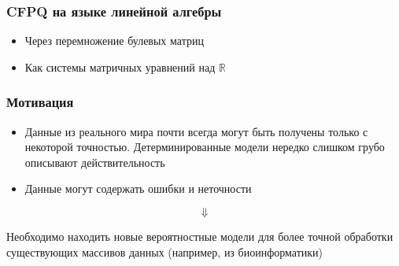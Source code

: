 \documentclass[xcolor=table]{beamer}
\begin{document}
\begin{frame}[fragile]
  \transwipe[direction=90]
  \frametitle{CFPQ на языке линейной алгебры}
\begin{itemize}
  \item Через перемножение булевых матриц
            \begin{minipage}{.9\linewidth}
            \begin{algorithm}[H]
            \begin{algorithmic}
                \EndFor
                \EndWhile
            \end{algorithmic}
            \end{algorithm}
            \end{minipage}
  \item Как системы матричных уравнений над $\mathbb{R}$
            \begin{minipage}{.9\linewidth}
            \begin{algorithm}[H]
            \begin{algorithmic}
            \EndFor
            \end{algorithmic}
            \end{algorithm}
            \end{minipage}
\end{itemize}

\end{frame}



\begin{frame}[fragile]
  \transwipe[direction=90]
  \frametitle{Мотивация}
\begin{itemize}
  \item Данные из реального мира почти всегда могут быть получены только с некоторой точностью. Детерминированные модели нередко слишком грубо описывают действительность
  \item Данные могут содержать ошибки и неточности
\end{itemize}

$$\Downarrow$$

\begin{center}
    Необходимо находить новые вероятностные модели для более точной обработки существующих массивов данных (например, из биоинформатики)
\end{center}
\end{frame}
\end{document}

